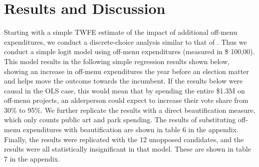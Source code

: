 \section*{Results and Discussion}

Starting with a simple TWFE estimate of the impact of additional off-menu expenditures, we conduct a discrete-choice analysis similar to that of \cite{berry1994}. 
Thus we conduct a simple logit model using off-menu expenditures (measured in \$ 100,00). 
This model results in the following simple regression results shown below, showing an increase in off-menu expenditures the year before an election matter and helps move the outcome towards the incumbent. 
If the results below were causal in the OLS case, this would mean that by spending the entire \$1.3M on off-menu projects, an alderperson could expect to increase their vote share from 30\% to 95\%. We further replicate the results with a direct beautification measure, which only counts public art and park spending.
 The results of substituting off-menu expenditures with beautification are shown in table 6 in the appendix. 
 Finally, the results were replicated with the 12 unopposed candidates, and the results were all statistically insignificant in that model. 
 These are shown in table 7 in the appendix.


